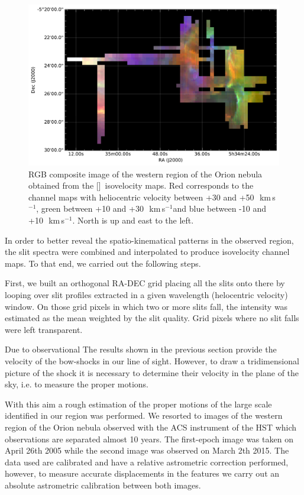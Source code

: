 \documentclass[a4paper,fleqn,usenatbib]{mnras}     %
\newcommand{\NII} {[\ion{N}{ii}]}            %
\newcommand{\kms}{\,km\,s$^{-1}$}	       %
\begin{document}
\begin{figure}
		\includegraphics[width=\textwidth]{Figs/rgb_core_NII.pdf} 
		\caption{RGB composite image of the western region of the Orion nebula obtained from the \NII~isovelocity  maps. Red corresponds
		to the channel maps with heliocentric velocity between +30 and +50~\kms, green between +10 and +30~\kms and blue between 
		-10 and +10~\kms. North is up and east to the left.}
    \label{fig:isov_maps}
\end{figure}

In order to better reveal the spatio-kinematical patterns in the observed region, the slit spectra were combined and interpolated 
to produce isovelocity channel maps. To that end, we carried out the following steps.

First, we built an orthogonal RA-DEC grid placing all the slits onto there by looping over slit profiles extracted in a 
given wavelength (helocentric velocity) window. On those grid pixels in which two or more slits fall, the intensity was estimated 
as the mean weighted by the slit quality. Grid pixels where no slit falls were left transparent.

Due to observational The results shown in the previous section provide the velocity of the bow-shocks in our line of sight. However, to draw a tridimensional picture of the shock it is necessary to determine their velocity in the plane of the sky, i.e. to measure the proper motions.

With this aim a rough estimation of the proper motions of the large scale identified in our region was performed. We resorted to images of the western region of the Orion nebula observed with the ACS instrument of the HST which observations are separated almost 10 years. The first-epoch image was taken on April 26th 2005 while the second image was observed on March 2th 2015. The data used are calibrated and have a relative astrometric correction performed, however, to measure accurate displacements in the features we carry out an absolute astrometric calibration between both images.
\end{document}
